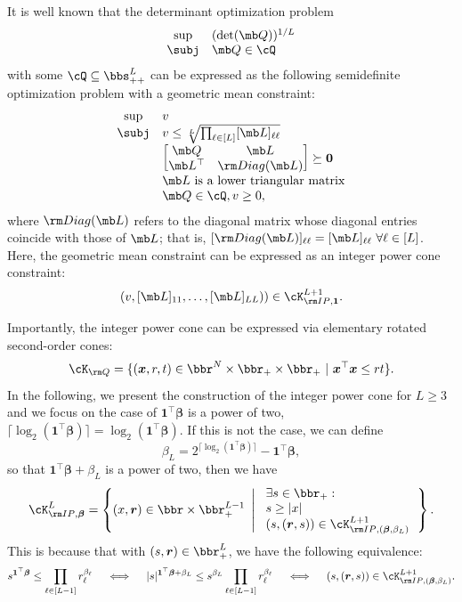 \documentclass[opre, blindrev]{informs4}
\newcommand{\1}[1]{\mathds{1}{\left(#1\right)}}
\begin{document}
\begin{appendices}
\begin{example}
It is well known that the determinant optimization problem
$$
\begin{array}{cl}
\sup & (\det (\mb Q))^{1/L} \\
\subj & \mb Q \in \cQ
\end{array}
$$
with some $\cQ \subseteq \bbs^L_{++}$ can be expressed as the following semidefinite optimization problem with a geometric mean constraint:
$$
\begin{array}{cl}
\sup &  v\\
\subj & v \leq \sqrt[L]{\prod_{\ell \in [L]} [\mb L]_{\ell \ell}} \\
& \begin{bmatrix}\mb Q & \mb L \\
\mb L^\top & {\rm Diag}(\mb L)
\end{bmatrix} \succeq \bm 0 \\
& \mb L ~\mbox{is a lower triangular matrix}\\
& \mb Q \in \cQ, v \geq 0,
\end{array}
$$
where ${\rm Diag}(\mb L)$ refers to the diagonal matrix whose diagonal entries coincide with those of $\mb L$; that is, $[{\rm Diag}(\mb L)]_{\ell \ell} = [\mb L]_{\ell \ell} ~\forall \ell \in [L]$.
Here, the geometric mean constraint can be expressed as an integer power cone constraint:
$$
(v,[\mb L]_{11},\dots,[\mb L]_{LL} )) \in \cK^{L+1}_{{\rm IP},\bm 1}. 
$$
\end{example}

Importantly, the integer power cone can be expressed via elementary rotated second-order cones:
$$
\cK_{\rm Q} = \{ (\bm x,r,t) \in \bbr^{N} \times \bbr_+ \times \bbr_+ ~|~ \bm x^\top \bm x \leq rt \}. 
$$
In the following, we present the construction of the integer power cone for $L \geq 3$ and we focus on the case of $\bm 1^\top \bm \beta$ is a power of two, \ie $\lceil \log_2(\bm 1^\top \bm \beta) \rceil = \log_2(\bm 1^\top \bm \beta)$. If this is not the case, we can define 
$$
\beta_L = 2^{\lceil\log_2(\bm 1^\top \bm \beta) \rceil} - \bm 1^\top \bm \beta,
$$
so that $\bm 1^\top \bm \beta + \beta_L$ is a power of two, then we have 
$$
\cK^{L}_{{\rm IP},\bm \beta} = \left\{ (x,\bm r) \in \bbr \times \bbr^{L-1}_+ ~\left|~
\begin{array}{l}
\exists s \in \bbr_+:\\
s \geq |x| \\
(s, (\bm r,s)) \in  \cK^{L+1}_{{\rm IP},(\bm \beta,\beta_L)} 
\end{array}
\right.\right\}.
$$
This is because that with $(s,\bm r) \in \bbr^L_+$, we have the following equivalence:
$$
s^{\bm 1^\top \bm \beta} \leq \prod_{\ell \in [L-1]} r^{\beta_\ell}_\ell 
~~~\iff~~~
|s|^{\bm 1^\top \bm \beta+\beta_L} \leq s^{\beta_L} \prod_{\ell \in [L-1]} r^{\beta_\ell}_\ell \\
~~~\iff~~~
(s, (\bm r,s)) \in  \cK^{L+1}_{{\rm IP},(\bm \beta,\beta_L)}.
$$


\end{appendices}
\end{document}
